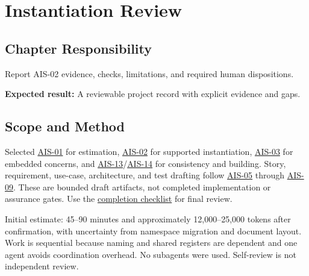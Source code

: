 \chapter{Instantiation Review}
\section{Chapter Responsibility}
\label{Section:InstantiationReviewResponsibility}
Report AIS-02 evidence, checks, limitations, and required human dispositions.

\noindent\textbf{Expected result:} A reviewable project record with explicit evidence and gaps.


\section{Scope and Method}
Selected \hyperref[Skill:AIS-01]{AIS-01} for estimation, \hyperref[Skill:AIS-02]{AIS-02} for supported instantiation, \hyperref[Skill:AIS-03]{AIS-03} for embedded concerns, and \hyperref[Skill:AIS-13]{AIS-13}/\hyperref[Skill:AIS-14]{AIS-14} for consistency and building. Story, requirement, use-case, architecture, and test drafting follow \hyperref[Skill:AIS-05]{AIS-05} through \hyperref[Skill:AIS-09]{AIS-09}. These are bounded draft artifacts, not completed implementation or assurance gates. Use the \hyperref[Table:AICompletionChecklist]{completion checklist} for final review.

Initial estimate: 45--90 minutes and approximately 12,000--25,000 tokens after confirmation, with uncertainty from namespace migration and document layout. Work is sequential because naming and shared registers are dependent and one agent avoids coordination overhead. No subagents were used. Self-review is not independent review.

